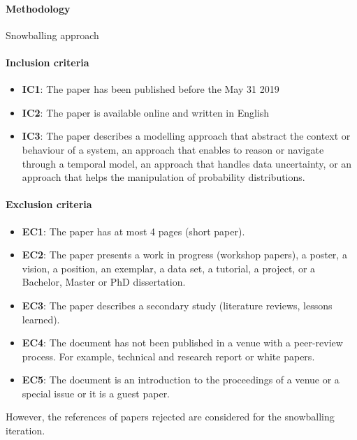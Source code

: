 \paragraph{Methodology}
Snowballing approach~\cite{DBLP:conf/ease/Wohlin14}

\paragraph{Inclusion criteria}
\begin{itemize}
	\item \textbf{IC1}: The paper has been published before the May 31 2019
	\item \textbf{IC2}: The paper is available online and written in English
	\item \textbf{IC3}: The paper describes a modelling approach that abstract the context or behaviour of a system, an approach that enables to reason or navigate through a temporal model, an approach that handles data uncertainty, or an approach that helps the manipulation of probability distributions. %
\end{itemize}

\paragraph{Exclusion criteria}
\begin{itemize}
	\item \textbf{EC1}: The paper has at most 4 pages (short paper).
	\item \textbf{EC2}: The paper presents a work in progress (workshop papers), a poster, a vision, a position, an exemplar, a data set, a tutorial, a project, or a Bachelor, Master or PhD dissertation.
	\item \textbf{EC3}: The paper describes a secondary study (\eg literature reviews, lessons learned).
	\item \textbf{EC4}: The document has not been published in a venue with a peer-review process. For example, technical and research report or white papers.
	\item \textbf{EC5}: The document is an introduction to the proceedings of a venue or a special issue or it is a guest paper.
\end{itemize}

However, the references of papers rejected are considered for the snowballing iteration.